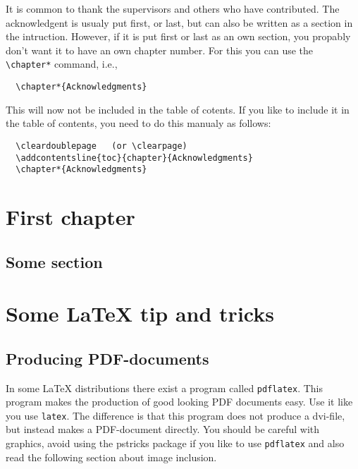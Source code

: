 \documentclass[a4paper,11pt,twoside]{report}
\begin{document}
It is common to thank the supervisors and others who have contributed.
The acknowledgent is usualy put first, or last, but can also be
written as a section in the intruction. However, if it is put first
or last as an own section, you propably don't want it to have an own
chapter number. For this you can use the \verb+\chapter*+ command, i.e.,
\begin{verbatim}
  \chapter*{Acknowledgments}
\end{verbatim}
This will now not be included in the table of cotents. If you
like to include it in the table of contents, you need to do this
manualy as follows:
\begin{verbatim}
  \cleardoublepage   (or \clearpage)
  \addcontentsline{toc}{chapter}{Acknowledgments}
  \chapter*{Acknowledgments}
\end{verbatim}


\cleardoublepage

\tableofcontents
\cleardoublepage

\pagestyle{fancy}
\setcounter{page}{1}

\chapter{First chapter}

\section{Some section}




\chapter{Some {\LaTeX} tip and tricks}

\section{Producing PDF-documents}

In some LaTeX distributions there exist a program called
\texttt{pdflatex}. This program makes the production of good looking PDF 
documents easy. Use it like you use \texttt{latex}. The difference is that
this program does not produce a dvi-file, but instead makes a
PDF-document directly. You should be careful with graphics, avoid
using the pstricks package if you like to use \texttt{pdflatex} and also
read the following section about image inclusion.
\end{document}
